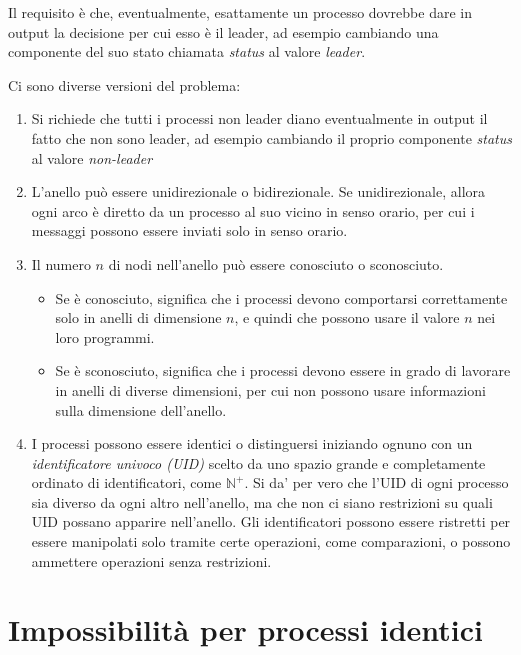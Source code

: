 \documentclass[italian,]{book}
\providecommand{\tightlist}{%
  \setlength{\itemsep}{0pt}\setlength{\parskip}{0pt}}
\begin{document}
Il requisito è che, eventualmente, esattamente un processo dovrebbe dare
in output la decisione per cui esso è il leader, ad esempio cambiando
una componente del suo stato chiamata \emph{status} al valore
\emph{leader}.

Ci sono diverse versioni del problema:

\begin{enumerate}
\def\labelenumi{\arabic{enumi}.}
\item
  Si richiede che tutti i processi non leader diano eventualmente in
  output il fatto che non sono leader, ad esempio cambiando il proprio
  componente \emph{status} al valore \emph{non-leader}
\item
  L'anello può essere unidirezionale o bidirezionale. Se unidirezionale,
  allora ogni arco è diretto da un processo al suo vicino in senso
  orario, per cui i messaggi possono essere inviati solo in senso
  orario.
\item
  Il numero \(n\) di nodi nell'anello può essere conosciuto o
  sconosciuto.

  \begin{itemize}
  \tightlist
  \item
    Se è conosciuto, significa che i processi devono comportarsi
    correttamente solo in anelli di dimensione \(n\), e quindi che
    possono usare il valore \(n\) nei loro programmi.
  \item
    Se è sconosciuto, significa che i processi devono essere in grado di
    lavorare in anelli di diverse dimensioni, per cui non possono usare
    informazioni sulla dimensione dell'anello.
  \end{itemize}
\item
  I processi possono essere identici o distinguersi iniziando ognuno con
  un \emph{identificatore univoco (UID)} scelto da uno spazio grande e
  completamente ordinato di identificatori, come \(\mathbb{N}^+\). Si
  da' per vero che l'UID di ogni processo sia diverso da ogni altro
  nell'anello, ma che non ci siano restrizioni su quali UID possano
  apparire nell'anello. Gli identificatori possono essere ristretti per
  essere manipolati solo tramite certe operazioni, come comparazioni, o
  possono ammettere operazioni senza restrizioni.
\end{enumerate}

\hypertarget{impossibilituxe0-per-processi-identici}{%
\section{Impossibilità per processi
identici}\label{impossibilituxe0-per-processi-identici}}
\end{document}
